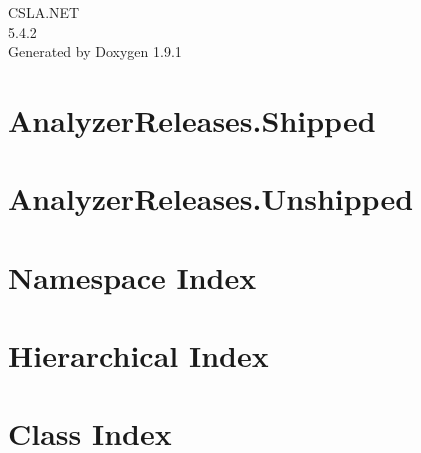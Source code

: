 \let\mypdfximage\pdfximage\def\pdfximage{\immediate\mypdfximage}\documentclass[twoside]{book}
\newcommand{\+}{\discretionary{\mbox{\scriptsize$\hookleftarrow$}}{}{}}
\newcommand{\clearemptydoublepage}{%
  \newpage{\pagestyle{empty}\cleardoublepage}%
}
\begin{document}
\raggedbottom

\hypersetup{pageanchor=false,
             bookmarksnumbered=true,
             pdfencoding=unicode
            }
\begin{titlepage}
\vspace*{7cm}
\begin{center}%
{\Large CSLA.\+NET \\[1ex]\large 5.\+4.\+2 }\\
\vspace*{1cm}
{\large Generated by Doxygen 1.9.1}\\
\end{center}
\end{titlepage}
\clearemptydoublepage
{}
\tableofcontents
\clearemptydoublepage
{}
\hypersetup{pageanchor=true}

\chapter{Analyzer\+Releases.\+Shipped}
\label{md__c___users_korye_source_repos_csla__source__csla__analyzers__csla__analyzers__analyzer_releases__shipped}

\chapter{Analyzer\+Releases.\+Unshipped}
\label{md__c___users_korye_source_repos_csla__source__csla__analyzers__csla__analyzers__analyzer_releases__unshipped}

\chapter{Namespace Index}

\chapter{Hierarchical Index}

\chapter{Class Index}

\end{document}
